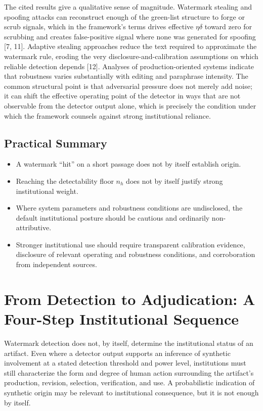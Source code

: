 \documentclass[11pt]{article}
\begin{document}
The cited results give a qualitative sense of magnitude. Watermark stealing and
spoofing attacks can reconstruct enough of the green-list structure to forge or scrub
signals, which in the framework's terms drives effective $\eta\delta$ toward zero for
scrubbing and creates false-positive signal where none was generated for spoofing
[7, 11]. Adaptive stealing approaches reduce the text required to approximate the
watermark rule, eroding the very disclosure-and-calibration assumptions on which
reliable detection depends [12]. Analyses of production-oriented systems indicate
that robustness varies substantially with editing and paraphrase intensity. The
common structural point is that adversarial pressure does not merely add noise; it
can shift the effective operating point of the detector in ways that are not
observable from the detector output alone, which is precisely the condition under
which the framework counsels against strong institutional reliance.

\subsection{Practical Summary}

\begin{itemize}[leftmargin=2em]
\item A watermark ``hit'' on a short passage does not by itself establish origin.
\item Reaching the detectability floor $n_h$ does not by itself justify strong
institutional weight.
\item Where system parameters and robustness conditions are undisclosed, the default
institutional posture should be cautious and ordinarily non-attributive.
\item Stronger institutional use should require transparent calibration evidence,
disclosure of relevant operating and robustness conditions, and corroboration from
independent sources.
\end{itemize}

\section{From Detection to Adjudication: A Four-Step Institutional Sequence}

Watermark detection does not, by itself, determine the institutional status of an
artifact. Even where a detector output supports an inference of synthetic involvement
at a stated detection threshold and power level, institutions must still
characterize the form and degree of human action surrounding the artifact's
production, revision, selection, verification, and use. A probabilistic indication of
synthetic origin may be relevant to institutional consequence, but it is not enough
by itself.
\end{document}
